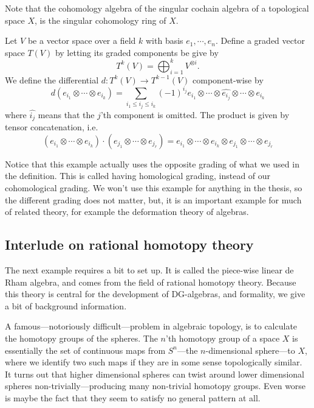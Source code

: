 Note that the cohomology algebra of the singular cochain algebra of a topological space $X$, is the singular cohomology ring of $X$.

\begin{example}
Let $V$ be a vector space over a field $k$ with basis $e_1, \cdots, e_n$. Define a graded vector space $T(V)$ by letting its graded components be give by
\begin{equation*}
    T^k(V) = \bigoplus_{i=1}^k V^{\otimes i}.
\end{equation*}
We define the differential $d\colon T^k(V)\longrightarrow T^{k-1}(V)$ component-wise by
\begin{equation*}
    d(e_{i_1}\otimes \cdots \otimes e_{i_k}) = \sum_{i_1\leq i_j\leq i_k}(-1)^{i_j}e_{i_1}\otimes \cdots \otimes \widehat{e_{i_j}}\otimes \cdots \otimes e_{i_k}
\end{equation*}
where $\widehat{i_j}$ means that the $j$'th component is omitted. The product is given by tensor concatenation, i.e. 
\begin{equation*}
    (e_{i_1}\otimes \cdots \otimes e_{i_k})\cdot(e_{j_1}\otimes \cdots \otimes e_{j_r}) = e_{i_1}\otimes \cdots \otimes e_{i_k}\otimes e_{j_1}\otimes \cdots \otimes e_{j_r}
\end{equation*}
\end{example}

Notice that this example actually uses the opposite grading of what we used in the definition. This is called having homological grading, instead of our cohomological grading. We won't use this example for anything in the thesis, so the different grading does not matter, but, it is an important example for much of related theory, for example the deformation theory of algebras. 

\subsection*{Interlude on rational homotopy theory}

The next example requires a bit to set up. It is called the piece-wise linear de Rham algebra, and comes from the field of rational homotopy theory. Because this theory is central for the development of DG-algebras, and formality, we give a bit of background information. 

A famous---notoriously difficult---problem in algebraic topology, is to calculate the homotopy groups of the spheres. The $n$'th homotopy group of a space $X$ is essentially the set of continuous maps from $S^n$---the $n$-dimensional sphere---to $X$, where we identify two such maps if they are in some sense topologically similar. It turns out that higher dimensional spheres can twist around lower dimensional spheres non-trivially---producing many non-trivial homotopy groups. Even worse is maybe the fact that they seem to satisfy no general pattern at all. 

